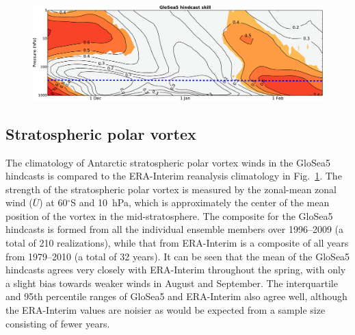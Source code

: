 \begin{figure}[t] \centering
  \noindent\includegraphics[width=\textwidth,angle=0]{figures/chapter-seasonal/NH_lag_height_corr.pdf}\\
  \caption[]{}\label{fig:sh_zmzw_clim}
\end{figure}



\subsection{Stratospheric polar vortex}

The climatology of Antarctic stratospheric polar vortex winds in the GloSea5
hindcasts is compared to the ERA-Interim reanalysis climatology in Fig.\
\ref{fig:sh_zmzw_clim}. The strength of the stratospheric polar vortex is
measured by the zonal-mean zonal wind ($\overline{U}$) at 60$^{\circ}$S and
10~hPa, which is approximately the center of the mean position of the vortex in
the mid-stratosphere. The composite for the GloSea5 hindcasts is formed from all
the individual ensemble members over 1996--2009 (a total of 210 realizations),
while that from ERA-Interim is a composite of all years from 1979--2010 (a total
of 32 years). It can be seen that the mean of the GloSea5 hindcasts agrees very
closely with ERA-Interim throughout the spring, with only a slight bias towards
weaker winds in August and September. The interquartile and 95th percentile
ranges of GloSea5 and ERA-Interim also agree well, although the ERA-Interim
values are noisier as would be expected from a sample size consisting of fewer
years.

